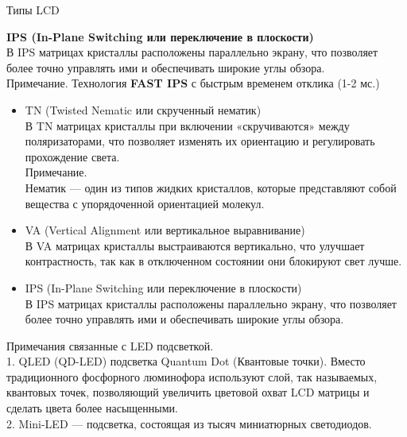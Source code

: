\documentclass{beamer}
\begin{document}
\begin{frame}{Типы LCD}
{		
			\textbf{ IPS (In-Plane Switching или переключение в плоскости)} \\
			В IPS матрицах кристаллы расположены параллельно экрану, что позволяет более точно управлять ими и обеспечивать широкие углы обзора.\\
			Примечание. Технология \textbf{FAST IPS} с быстрым временем отклика (1-2 мс.)

			\begin{itemize}
				\item 
				TN (Twisted Nematic или скрученный нематик) \\
				В TN матрицах кристаллы при включении «скручиваются» между поляризаторами, что позволяет изменять их ориентацию и регулировать прохождение света.\\
				Примечание. \\
				Нематик --- один из типов жидких кристаллов, которые представляют собой вещества с упорядоченной ориентацией молекул.
				\item 
				VA (Vertical Alignment или вертикальное выравнивание) \\
				В VA матрицах кристаллы выстраиваются вертикально, что улучшает контрастность, так как в отключенном состоянии они блокируют свет лучше.
				\item 
				IPS (In-Plane Switching или переключение в плоскости) \\
				В IPS матрицах кристаллы расположены параллельно экрану, что позволяет более точно управлять ими и обеспечивать широкие углы обзора.

			\end{itemize}
			\fi
				\vspace{0.15cm}
			Примечания связанные с LED подсветкой.\\
			1. QLED (QD-LED) подсветка Quantum Dot (Квантовые точки). Вместо традиционного фосфорного люминофора используют слой, так называемых, квантовых точек, позволяющий увеличить цветовой охват LCD матрицы и сделать цвета более насыщенными.\\
			2. Mini-LED --- подсветка, состоящая из тысяч миниатюрных светодиодов. 

		}

	\end{frame}
\end{document}
